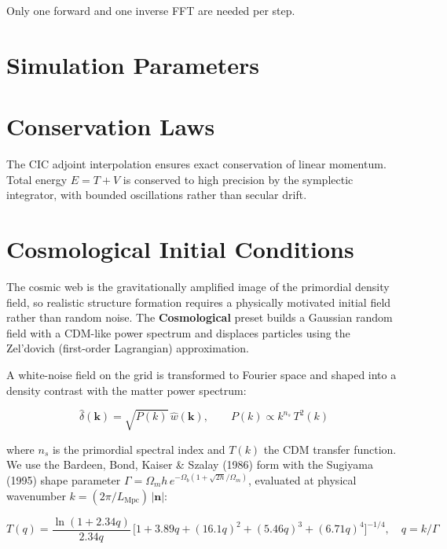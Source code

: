 Only one forward and one inverse FFT are needed per step.

\section{Simulation Parameters}


\section{Conservation Laws}

The CIC adjoint interpolation ensures exact conservation of linear
momentum. Total energy $E = T + V$ is conserved to high precision
by the symplectic integrator, with bounded oscillations rather than
secular drift.

\section{Cosmological Initial Conditions}

The cosmic web is the gravitationally amplified image of the primordial
density field, so realistic structure formation requires a physically
motivated initial field rather than random noise. The \textbf{Cosmological}
preset builds a Gaussian random field with a CDM-like power spectrum and
displaces particles using the Zel'dovich (first-order Lagrangian) approximation.

A white-noise field on the grid is transformed to Fourier space and shaped
into a density contrast with the matter power spectrum:

\begin{equation}
\hat{\delta}(\mathbf{k}) = \sqrt{P(k)}\,\hat{w}(\mathbf{k}), \qquad
P(k) \propto k^{n_s}\,T^2(k)
\end{equation}

where $n_s$ is the primordial spectral index and $T(k)$ the CDM transfer
function. We use the Bardeen, Bond, Kaiser \& Szalay (1986) form with the
Sugiyama (1995) shape parameter $\Gamma = \Omega_m h\,e^{-\Omega_b(1+\sqrt{2h}/\Omega_m)}$,
evaluated at physical wavenumber $k = (2\pi/L_\text{Mpc})\,|\mathbf{n}|$:

\begin{equation}
T(q) = \frac{\ln(1+2.34q)}{2.34q}\,\big[1 + 3.89q + (16.1q)^2 + (5.46q)^3 + (6.71q)^4\big]^{-1/4},
\quad q = k/\Gamma
\end{equation}

